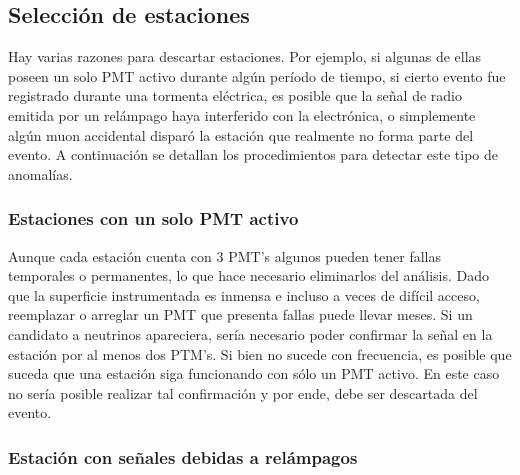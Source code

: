 		\fi

	\subsection{Selección de estaciones}
	
	Hay varias razones para descartar estaciones. Por ejemplo, si algunas de ellas poseen un solo PMT activo durante algún período de tiempo, si cierto evento fue registrado durante una tormenta eléctrica, es posible que la señal de radio emitida por un relámpago haya interferido con la electrónica, o simplemente algún muon accidental disparó la estación que realmente no forma parte del evento.
	A continuación se detallan los procedimientos para detectar este tipo de anomal\'ias.
	
		\subsubsection{Estaciones con un solo PMT activo}
		
		Aunque cada estación cuenta con 3 PMT's algunos pueden tener fallas temporales o permanentes, lo que hace necesario eliminarlos del análisis.
		Dado que la superficie instrumentada es inmensa e incluso a veces de dif\'icil acceso, reemplazar o arreglar un PMT que presenta fallas puede llevar meses.
		Si un candidato a neutrinos apareciera, ser\'ia necesario poder confirmar la señal en la estación por al menos dos PTM's. 
		Si bien no sucede con frecuencia, es posible que suceda que una estación siga funcionando con s\'olo un PMT activo.
		En este caso no sería posible realizar tal confirmación y por ende, debe ser descartada del evento.
		
		\subsubsection{Estación con señales debidas a relámpagos}
		
